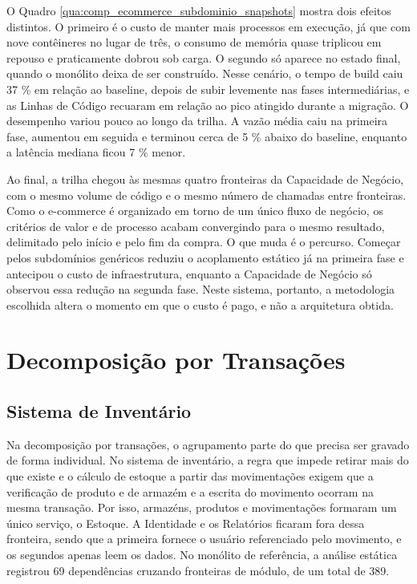 O Quadro \ref{qua:comp_ecommerce_subdominio_snapshots} mostra dois efeitos distintos. O primeiro é o custo de manter mais processos em execução, já que com nove contêineres no lugar de três, o consumo de memória quase triplicou em repouso e praticamente dobrou sob carga. O segundo só aparece no estado final, quando o monólito deixa de ser construído. Nesse cenário, o tempo de build caiu 37 \% em relação ao baseline, depois de subir levemente nas fases intermediárias, e as Linhas de Código recuaram em relação ao pico atingido durante a migração. O desempenho variou pouco ao longo da trilha. A vazão média caiu na primeira fase, aumentou em seguida e terminou cerca de 5 \% abaixo do baseline, enquanto a latência mediana ficou 7 \% menor.



Ao final, a trilha chegou às mesmas quatro fronteiras da Capacidade de Negócio, com o mesmo volume de código e o mesmo número de chamadas entre fronteiras. Como o e-commerce é organizado em torno de um único fluxo de negócio, os critérios de valor e de processo acabam convergindo para o mesmo resultado, delimitado pelo início e pelo fim da compra. O que muda é o percurso. Começar pelos subdomínios genéricos reduziu o acoplamento estático já na primeira fase e antecipou o custo de infraestrutura, enquanto a Capacidade de Negócio só observou essa redução na segunda fase. Neste sistema, portanto, a metodologia escolhida altera o momento em que o custo é pago, e não a arquitetura obtida.



\section{Decomposição por Transações}
\label{sec:metodologia_transacoes}

\subsection*{Sistema de Inventário}

Na decomposição por transações, o agrupamento parte do que precisa ser gravado de forma individual. No sistema de inventário, a regra que impede retirar mais do que existe e o cálculo de estoque a partir das movimentações exigem que a verificação de produto e de armazém e a escrita do movimento ocorram na mesma transação. Por isso, armazéns, produtos e movimentações formaram um único serviço, o Estoque. A Identidade e os Relatórios ficaram fora dessa fronteira, sendo que a primeira fornece o usuário referenciado pelo movimento, e os segundos apenas leem os dados. No monólito de referência, a análise estática registrou 69 dependências cruzando fronteiras de módulo, de um total de 389.

